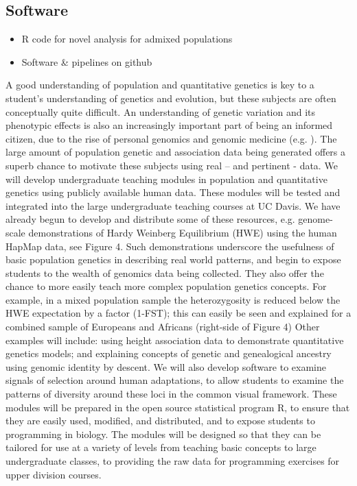 \subsection*{Software} %
\begin{itemize}
\item R code for novel analysis for admixed populations
\item Software \& pipelines on github
\end{itemize}


A good understanding of population and quantitative genetics is key to a student’s understanding of genetics and evolution, but these subjects are often conceptually quite difficult. An understanding of genetic variation and its phenotypic effects is also an increasingly important part of being an informed citizen, due to the rise of personal genomics and genomic medicine (e.g. ). The large amount of population genetic and association data being generated offers a superb chance to motivate these subjects using real – and pertinent - data. 
We will develop undergraduate teaching modules in population and quantitative genetics using publicly available human data. These modules will be tested and integrated into the large undergraduate teaching courses at UC Davis. We have already begun to develop and distribute some of these resources, e.g. genome-scale demonstrations of Hardy Weinberg Equilibrium (HWE) using the human HapMap data, see Figure 4. Such demonstrations underscore the usefulness of basic population genetics in describing real world patterns, and begin to expose students to the wealth of genomics data being collected. They also offer the chance to more easily teach more complex population genetics concepts. For example, in a mixed population sample the heterozygosity is reduced below the HWE expectation by a factor (1-FST); this can easily be seen and explained for a combined sample of Europeans and Africans (right-side of Figure 4)
Other examples will include: using height association data to demonstrate quantitative genetics models; and explaining concepts of genetic and genealogical ancestry using genomic identity by descent. We will also develop software to examine signals of selection around human adaptations, to allow students to examine the patterns of diversity around these loci in the common visual framework. These modules will be prepared in the open source statistical program R, to ensure that they are easily used, modified, and distributed, and to expose students to programming in biology. The modules will be designed so that they can be tailored for use at a variety of levels from teaching basic concepts to large undergraduate classes, to providing the raw data for programming exercises for upper division courses.

